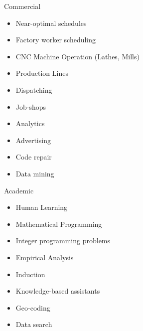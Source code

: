 \documentclass[tog]{acmsiggraph}
\begin{document}
Commercial
\begin{itemize}  
\item Near-optimal schedules
\item Factory worker scheduling
\item CNC Machine Operation (Lathes, Mills)
\item Production Lines
\item Dispatching
\item Job-shops
\item Analytics
\item Advertising
\item Code repair
\item Data mining
\end{itemize}
Academic
\begin{itemize} 
\item Human Learning
\item Mathematical Programming
\item Integer programming problems
\item Empirical Analysis
\item Induction
\item Knowledge-based assistants
\item Geo-coding
\item Data search
\end{itemize}
\end{document}
